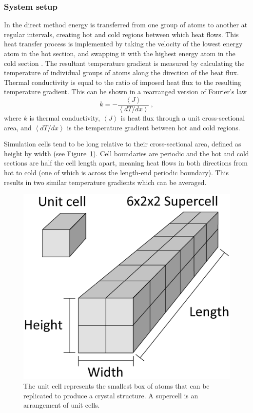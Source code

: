 \subsubsection{System setup}

In the direct method energy is transferred from one group of atoms to another at regular intervals, creating hot and cold regions between which heat flows. This heat transfer process is implemented by taking the velocity of the lowest energy atom in the hot section, and swapping it with the highest energy atom in the cold section \citep{Muller-Plathe1997}. The resultant temperature gradient is measured by calculating the temperature of individual groups of atoms along the direction of the heat flux. Thermal conductivity is equal to the ratio of imposed heat flux to the resulting temperature gradient. This can be shown in a rearranged version of Fourier's law
%
\begin{equation}
k = - \frac{\left \langle J \right \rangle}{\left \langle dT/dx \right \rangle}\ ,
\label{fourier2}  
\end{equation}
%
where $k$ is thermal conductivity, $\left \langle J \right \rangle$ is heat flux through a unit cross-sectional area, and $\left \langle dT/dx \right \rangle$ is the temperature gradient between hot and cold regions. 

Simulation cells tend to be long relative to their cross-sectional area, defined as height by width (see Figure~\ref{fig:cell_dia}). Cell boundaries are periodic and the hot and cold sections are half the cell length apart, meaning heat flows in both directions from hot to cold (one of which is across the length-end periodic boundary). This results in two similar temperature gradients which can be averaged.

\begin{figure}[h]
  \includegraphics[width=\linewidth]{Figures/cell_diagram.png}
  \caption{The unit cell represents the smallest box of atoms that can be replicated to produce a crystal structure. A supercell is an arrangement of unit cells.}
  \label{fig:cell_dia}
\end{figure}

